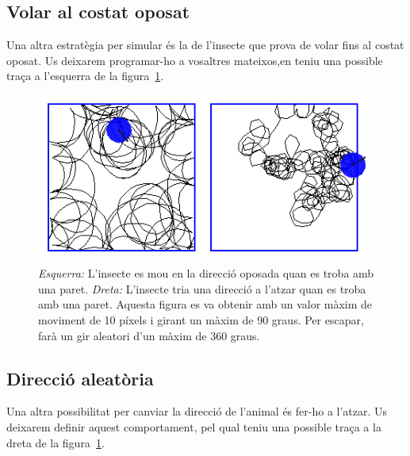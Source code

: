 \subsection{Volar al costat oposat}
Una altra estratègia per simular és la de l'insecte que prova de volar fins al costat oposat. Us deixarem programar-ho a vosaltres mateixos,en teniu una possible traça a l'esquerra de la figura~\ref{fig2306}.
\begin{figure}[h!]
\begin{center}
\includegraphics[scale=0.5]{Imatges/figura23-6}
\end{center}
\caption{\emph{Esquerra:} L'insecte es mou en la direcció oposada quan es troba amb una paret.
\emph{Dreta:} L'insecte tria una direcció a l'atzar quan es troba amb una paret. Aquesta figura es va obtenir amb un valor màxim de moviment de 10 píxels i girant un màxim de 90 graus. Per escapar, farà un gir aleatori d'un màxim de 360 graus.}
\label{fig2306}
\end{figure}

\subsection{Direcció aleatòria}
Una altra possibilitat per canviar la direcció de l'animal és fer-ho a l'atzar. Us deixarem definir aquest comportament, pel qual teniu una possible traça a la dreta de la figura~\ref{fig2306}. 

